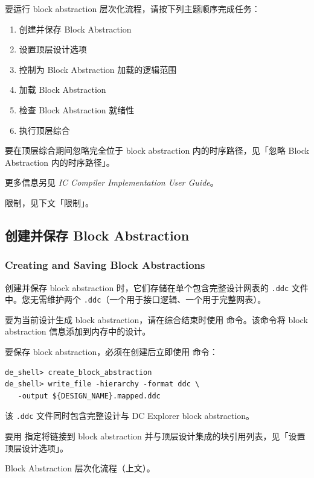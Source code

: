 要运行 block abstraction 层次化流程，请按下列主题顺序完成任务：
\begin{enumerate}
  \item 创建并保存 Block Abstraction
  \item 设置顶层设计选项
  \item 控制为 Block Abstraction 加载的逻辑范围
  \item 加载 Block Abstraction
  \item 检查 Block Abstraction 就绪性
  \item 执行顶层综合
\end{enumerate}

要在顶层综合期间忽略完全位于 block abstraction 内的时序路径，见「忽略 Block Abstraction 内的时序路径」。

更多信息另见 \textit{IC Compiler Implementation User Guide}。

\begin{seeAlsoBox}
限制，见下文「限制」。
\end{seeAlsoBox}

\subsection{创建并保存 Block Abstraction}
\subsubsection*{Creating and Saving Block Abstractions}

创建并保存 block abstraction 时，它们存储在单个包含完整设计网表的 \texttt{.ddc} 文件中。您无需维护两个 \texttt{.ddc}（一个用于接口逻辑、一个用于完整网表）。

要为当前设计生成 block abstraction，请在综合结束时使用  命令。该命令将 block abstraction 信息添加到内存中的设计。

要保存 block abstraction，必须在创建后立即使用  命令：
\begin{lstlisting}
de_shell> create_block_abstraction
de_shell> write_file -hierarchy -format ddc \
   -output ${DESIGN_NAME}.mapped.ddc
\end{lstlisting}

该 \texttt{.ddc} 文件同时包含完整设计与 DC Explorer block abstraction。

要用  指定将链接到 block abstraction 并与顶层设计集成的块引用列表，见「设置顶层设计选项」。

\begin{seeAlsoBox}
Block Abstraction 层次化流程（上文）。
\end{seeAlsoBox}

